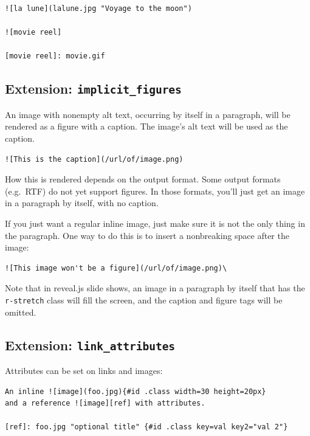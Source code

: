 \documentclass[
  b5paper
]{book}
\begin{document}
\begin{verbatim}
![la lune](lalune.jpg "Voyage to the moon")

![movie reel]

[movie reel]: movie.gif
\end{verbatim}

\subsection{\texorpdfstring{Extension:
\texttt{implicit\_figures}}{Extension: implicit\_figures}}\label{extension-implicit_figures}

An image with nonempty alt text, occurring by itself in a paragraph,
will be rendered as a figure with a caption. The image's alt text will
be used as the caption.

\begin{verbatim}
![This is the caption](/url/of/image.png)
\end{verbatim}

How this is rendered depends on the output format. Some output formats
(e.g.~RTF) do not yet support figures. In those formats, you'll just get
an image in a paragraph by itself, with no caption.

If you just want a regular inline image, just make sure it is not the
only thing in the paragraph. One way to do this is to insert a
nonbreaking space after the image:

\begin{verbatim}
![This image won't be a figure](/url/of/image.png)\
\end{verbatim}

Note that in reveal.js slide shows, an image in a paragraph by itself
that has the \texttt{r-stretch} class will fill the screen, and the
caption and figure tags will be omitted.

\subsection{\texorpdfstring{Extension:
\texttt{link\_attributes}}{Extension: link\_attributes}}\label{extension-link_attributes}

Attributes can be set on links and images:

\begin{verbatim}
An inline ![image](foo.jpg){#id .class width=30 height=20px}
and a reference ![image][ref] with attributes.

[ref]: foo.jpg "optional title" {#id .class key=val key2="val 2"}
\end{verbatim}
\end{document}
